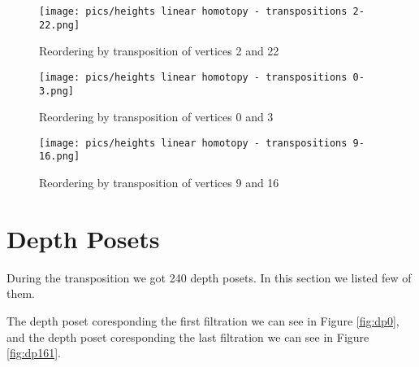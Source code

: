 \documentclass{article}
\begin{document}
\begin{figure}[htbp]
    \centering
    \texttt{[image: pics/heights linear homotopy - transpositions 2-22.png]}
    \caption{Reordering by transposition of vertices 2 and 22}
    \label{fig:transposition2and22}
\end{figure}
\begin{figure}[htbp]
    \centering
    \texttt{[image: pics/heights linear homotopy - transpositions 0-3.png]}
    \caption{Reordering by transposition of vertices 0 and 3}
    \label{fig:transposition0and3}
\end{figure}
\begin{figure}[htbp]
    \centering
    \texttt{[image: pics/heights linear homotopy - transpositions 9-16.png]}
    \caption{Reordering by transposition of vertices 9 and 16}
    \label{fig:transposition9and16}
\end{figure}

\newpage


\section{Depth Posets}
\par During the transposition we got 240 depth posets. In this section we listed few of them. 
\par The depth poset coresponding the first filtration we can see in Figure \ref{fig:dp0}, 
and the depth poset coresponding the last filtration we can see in Figure \ref{fig:dp161}.
\end{document}
